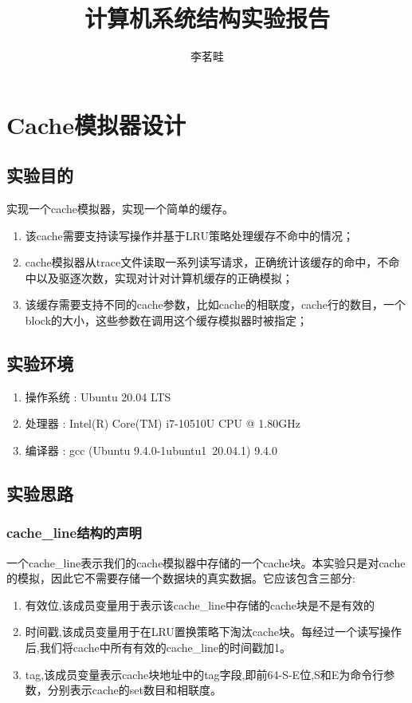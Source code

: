 \documentclass[supercite]{Experimental_Report}
\title{计算机系统结构实验报告}
\author{李茗畦}
\theoremstyle{definition}
\begin{document}
\maketitle

\tableofcontents

\section{Cache模拟器设计}


\subsection{实验目的}
实现一个cache模拟器，实现一个简单的缓存。
\begin{enumerate}
\item 该cache需要支持读写操作并基于LRU策略处理缓存不命中的情况；
\item cache模拟器从trace文件读取一系列读写请求，正确统计该缓存的命中，不命中以及驱逐次数，实现对计对计算机缓存的正确模拟；
\item 该缓存需要支持不同的cache参数，比如cache的相联度，cache行的数目，一个block的大小，这些参数在调用这个缓存模拟器时被指定；
\end{enumerate}

\subsection{实验环境}
\begin{enumerate}
\item 操作系统 : Ubuntu 20.04 LTS
\item 处理器 : Intel(R) Core(TM) i7-10510U CPU @ 1.80GHz
\item 编译器 : gcc (Ubuntu 9.4.0-1ubuntu1~20.04.1) 9.4.0
\end{enumerate}



\subsection{实验思路}
\subsubsection{cache\_line结构的声明}
一个cache\_line表示我们的cache模拟器中存储的一个cache块。本实验只是对cache的模拟，因此它不需要存储一个数据块的真实数据。它应该包含三部分:
\begin{enumerate}
  \item 有效位,该成员变量用于表示该cache\_line中存储的cache块是不是有效的
  \item 时间戳,该成员变量用于在LRU置换策略下淘汰cache块。每经过一个读写操作后,我们将cache中所有有效的cache\_line的时间戳加1。
  \item tag,该成员变量表示cache块地址中的tag字段,即前64-S-E位,S和E为命令行参数，分别表示cache的set数目和相联度。
\end{enumerate}
\end{document}
